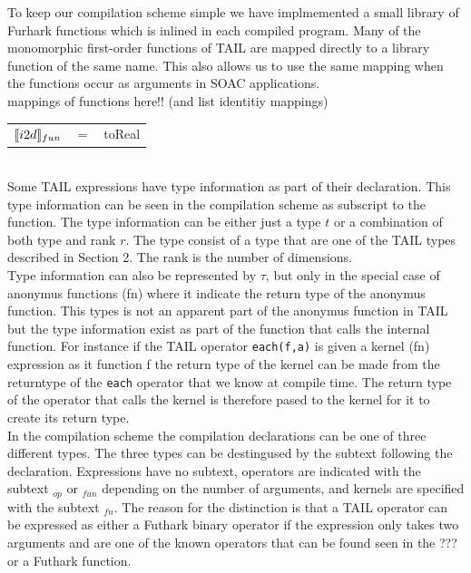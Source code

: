 \documentclass[11pt]{article}
\begin{document}
To keep our compilation scheme simple we have implmemented a small library of Furhark functions which is inlined
in each compiled program. Many of the monomorphic first-order functions of TAIL are mapped directly to a library function of the same name. This also allows us to use the same mapping when the functions occur as arguments in
SOAC applications.\\

mappings of functions here!! (and list identitiy mappings)\\
\begin{tabular}{l c l}
$\llbracket i2d \rrbracket_{fun}$ & $=$ & toReal\\ 
\end{tabular}\\

Some TAIL expressions have type information as part of their declaration. This type information can be seen in the
compilation scheme as subscript to the function. The type information can be either just a type $t$ or a combination of both type and rank $r$. The type consist of a type that are one of the TAIL
types described in Section 2. The rank is the number of dimensions.  \\

Type information can also be represented by $\tau$, but only in the special case of anonymus functions (fn) where it 
indicate the return type of the anonymus function. This types is not an apparent part of the anonymus function in TAIL
but the type information exist as part of the function that calls the internal function. For instance if the TAIL operator {\tt each(f,a)} is given a kernel (fn) expression as it function f the return type of the kernel can be made from the returntype of the {\tt each} operator that we know at compile time. The return type of the operator that calls the kernel is therefore pased to the kernel for it to create its return type. \\

In the compilation scheme the compilation declarations can be one of three different types. The three types can be destingused by the subtext following the declaration.  Expressions have no subtext, operators are indicated with the subtext $_{op}$ or $_{fun}$ depending on the number of arguments, and kernels are specified with the subtext $_{fn}$. The reason for the distinction is that a TAIL operator can be expressed as either a Futhark binary operator if the expression only takes two arguments and are one of the known operators that can be found seen in the ??? or a Futhark function. \\
\end{document}
